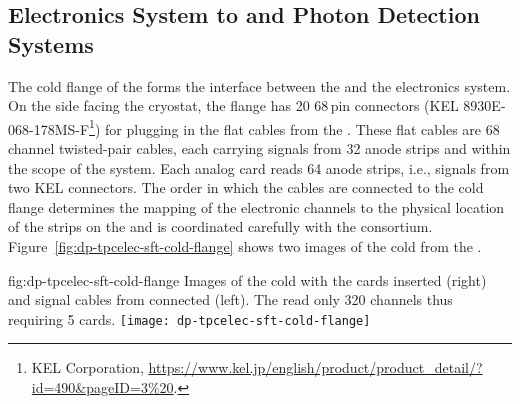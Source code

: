 \subsection{Electronics System to  and Photon Detection Systems}
\label{ssec:dp-tpcelec-intfc-crppmt}

The cold \fdth flange of the  forms the interface between the  and the  electronics system. On the side facing the cryostat, the flange  has \num{20} \num{68}\,pin connectors (KEL 8930E-068-178MS-F\footnote{KEL Corporation\texttrademark{}, \url{https://www.kel.jp/english/product/product_detail/?id=490\&pageID=3\%20}.}) for plugging in the flat cables from the . These flat cables are \num{68}\,channel twisted-pair cables, each carrying signals from \num{32} anode strips and within the scope of the  system. Each analog  card reads \num{64} anode strips, i.e., signals from two KEL connectors. The order in which the cables are connected to the cold flange determines the mapping of the electronic channels to the physical location of the strips on the  and is coordinated carefully with the  consortium. Figure~\ref{fig:dp-tpcelec-sft-cold-flange} shows two images of the cold \fdth from the .

\begin{dunefigure}{fig:dp-tpcelec-sft-cold-flange}
{Images of the   cold \fdth with the  cards inserted (right) and signal cables from  connected (left). The   read only \num{320} channels thus requiring \num{5}  cards. }%
\texttt{[image: dp-tpcelec-sft-cold-flange]}
\end{dunefigure}

